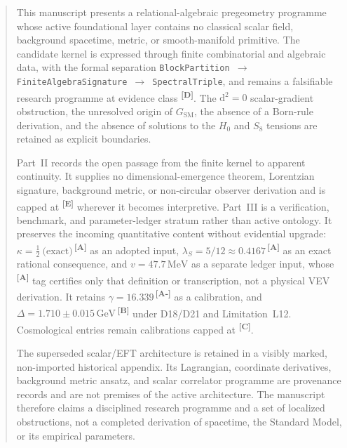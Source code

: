 \documentclass[12pt,a4paper,twoside]{article}
\theoremstyle{plain}
\theoremstyle{definition}
\theoremstyle{remark}
\newcommand{\GeV}{\,\mathrm{GeV}}
\newcommand{\MeV}{\,\mathrm{MeV}}
\newcommand{\catmark}[1]{\textsuperscript{\textsf{\textbf{[#1]}}}}
\newcommand{\lambdaS}{5/12 \approx 0.4167} %
\newcommand{\DeltaGap}{1.710 \pm 0.015\GeV} %
\newcommand{\GammaGeom}{16.339} %
\newcommand{\vVEV}{47.7\MeV} %
\newcommand{\KappaRG}{\tfrac{1}{2}\ \text{(exact)}} %
\begin{document}
\begin{abstract}
\begingroup \normalfont\normalsize
\setlength{\parskip}{0.65em plus 0.12em minus 0.04em}%
\setlength{\parindent}{0pt}%
\noindent This manuscript presents a relational-algebraic pregeometry
programme whose active foundational layer contains no classical scalar field,
background spacetime, metric, or smooth-manifold primitive. The candidate
kernel is expressed through finite combinatorial and algebraic data, with the
formal separation
\texttt{BlockPartition $\to$ FiniteAlgebraSignature $\to$ SpectralTriple},
and remains a falsifiable research programme at evidence class \catmark{D}.
The $\mathrm d^2=0$ scalar-gradient obstruction, the unresolved origin of
$G_{\mathrm{SM}}$, the absence of a Born-rule derivation, and the absence of
solutions to the $H_0$ and $S_8$ tensions are retained as explicit
boundaries.

Part~II records the open passage from the finite kernel to apparent
continuity. It supplies no dimensional-emergence theorem, Lorentzian
signature, background metric, or non-circular observer derivation and is
capped at \catmark{E} wherever it becomes interpretive. Part~III is a
verification, benchmark, and parameter-ledger stratum rather than active
ontology. It preserves the incoming quantitative content without evidential
upgrade: $\kappa=\KappaRG$\,\catmark{A} as an adopted input,
$\lambda_S=\lambdaS$\,\catmark{A} as an exact rational consequence, and
$v=\vVEV$ as a separate ledger input, whose \catmark{A} tag certifies only
that definition or transcription, not a physical VEV derivation.
It retains $\gamma=\GammaGeom$\,\catmark{A-} as a calibration, and
$\Delta=\DeltaGap$\,\catmark{B} under D18/D21 and Limitation~L12.
Cosmological entries remain calibrations capped at \catmark{C}.

The superseded scalar/EFT architecture is retained in a visibly marked,
non-imported historical appendix. Its Lagrangian, coordinate derivatives,
background metric ansatz, and scalar correlator programme are provenance
records and are not premises of the active architecture. The manuscript
therefore claims a disciplined research programme and a set of localized
obstructions, not a completed derivation of spacetime, the Standard Model, or
its empirical parameters.
\endgroup
\end{abstract}
\end{document}
